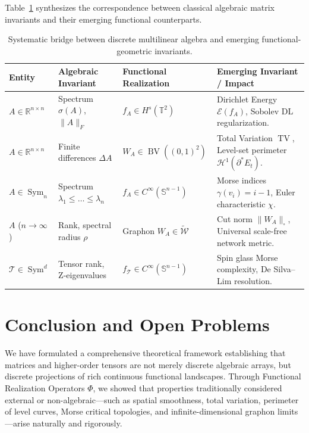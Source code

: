 \documentclass[11pt,a4paper,reqno]{amsart}
\theoremstyle{definition}
\numberwithin{equation}{section}
\providecommand{\R}{\mathbb{R}}
\providecommand{\Sph}{\mathbb{S}}
\newcommand{\Tor}{\mathbb{T}}
\providecommand{\BV}{\operatorname{BV}}
\providecommand{\TV}{\operatorname{TV}}
\providecommand{\cutnorm}[1]{\|#1\|_{\square}}
\providecommand{\Sph}{\mathbb{S}}
\providecommand{\R}{\mathbb{R}}
\providecommand{\BV}{\mathrm{BV}}
\providecommand{\TV}{\mathrm{TV}}
\providecommand{\cutnorm}[1]{\|#1\|_{\square}}
\begin{document}
Table~\ref{tab:comparison} synthesizes the correspondence between classical algebraic matrix invariants and their emerging functional counterparts.

\begin{table}[htbp]
\centering
\footnotesize
\renewcommand{\arraystretch}{1.3}
\begin{tabularx}{\textwidth}{@{}l X X X@{}}
\toprule
\textbf{Entity} & \textbf{Algebraic Invariant} & \textbf{Functional Realization} & \textbf{Emerging Invariant / Impact} \\
\midrule
$A \in \R^{n \times n}$ & Spectrum $\sigma(A)$, $\|A\|_F$ & $f_A \in H^s(\Tor^2)$ & Dirichlet Energy $\mathcal{E}(f_A)$, Sobolev DL regularization. \\
$A \in \R^{n \times n}$ & Finite differences $\Delta A$ & $W_A \in \BV((0,1)^2)$ & Total Variation $\TV$, Level-set perimeter $\mathcal{H}^1(\partial^* E_t)$. \\
$A \in \operatorname{Sym}_n$ & Spectrum $\lambda_1 \le \dots \le \lambda_n$ & $f_A \in C^\infty(\Sph^{n-1})$ & Morse indices $\gamma(v_i) = i-1$, Euler characteristic $\chi$. \\
$A$ ($n \to \infty$) & Rank, spectral radius $\rho$ & Graphon $W_A \in \widetilde{\mathcal{W}}$ & Cut norm $\cutnorm{W_A}$, Universal scale-free network metric. \\
$\mathcal{T} \in \operatorname{Sym}^d$ & Tensor rank, Z-eigenvalues & $f_{\mathcal{T}} \in C^\infty(\Sph^{n-1})$ & Spin glass Morse complexity, De Silva--Lim resolution. \\
\bottomrule
\end{tabularx}
\caption{Systematic bridge between discrete multilinear algebra and emerging functional-geometric invariants.}
\label{tab:comparison}
\end{table}

\section{Conclusion and Open Problems}
\label{sec:conclusion}

We have formulated a comprehensive theoretical framework establishing that matrices and higher-order tensors are not merely discrete algebraic arrays, but discrete projections of rich continuous functional landscapes. Through Functional Realization Operators $\Phi$, we showed that properties traditionally considered external or non-algebraic—such as spatial smoothness, total variation, perimeter of level curves, Morse critical topologies, and infinite-dimensional graphon limits—arise naturally and rigorously.
\end{document}
